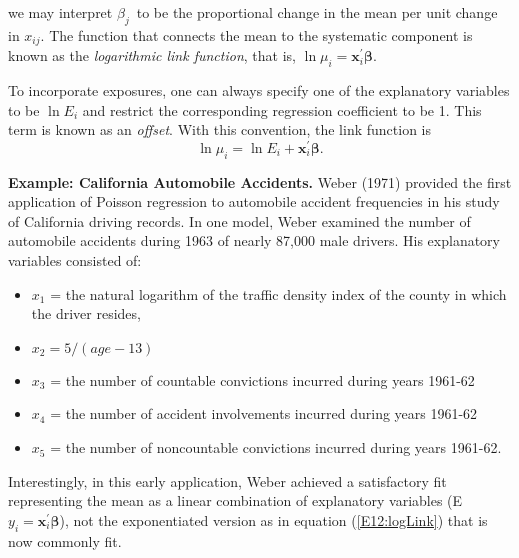 

\noindent we may interpret $\beta_j$\ to be the proportional change
in the mean per unit change in $x_{ij}$. The function that connects
the mean to the systematic component is known as the
\emph{logarithmic link function}, that is, $\ln
\mu_i=\mathbf{x}_i^{\prime }\boldsymbol \beta$.

To incorporate exposures, one can always specify one of the
explanatory variables to be $\ln E_i$ and restrict the corresponding
regression coefficient to be 1. This term is known as an
\emph{offset}. With this convention, the link function is
\begin{equation}\label{E12:logLink}
\ln \mu_i=\ln E_i+\mathbf{x}_i^{\prime }\boldsymbol \beta.
\end{equation}

\linejed{}

\textbf{Example: California Automobile
Accidents.} Weber
(1971) provided the first application of Poisson regression to
automobile accident frequencies in his study of California driving
records. In one model, Weber examined the number of automobile
accidents during 1963 of nearly 87,000 male drivers. His explanatory
variables consisted of:
\begin{itemize}
\item $x_1$ = the natural logarithm of the traffic
            density index of the county in which the driver resides,
\item $x_2 =5/(age-13)$
\item $x_3$ = the number of countable convictions incurred during
years 1961-62
\item $x_4$ = the number of accident involvements incurred during
years 1961-62
\item $x_5$ = the number of noncountable convictions incurred during
years 1961-62.
            \end{itemize}
Interestingly, in this early application, Weber achieved a
satisfactory fit representing the mean as a linear combination of
explanatory variables (E $y_i=\mathbf{x}_i^{\prime }\boldsymbol
\beta$), not the exponentiated version as in equation
(\ref{E12:logLink}) that is now commonly fit.


